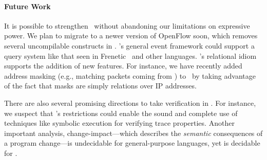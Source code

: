 

%
%
%
%


\paragraph{Future Work}

It is possible to strengthen \flowlog\ without abandoning our limitations on
expressive power. We plan to migrate to a newer version of OpenFlow soon,
which removes several uncompilable constructs in . 
\flowlog's general event framework could support a query system like that seen in
Frenetic~\cite{foster:icfp11-frenetic} and other languages.
\flowlog's relational idiom supports the addition of new features. For instance, we have 
recently added address masking (e.g., matching packets coming from ) to \flowlog\ by 
taking advantage of the fact that masks are simply relations over IP addresses. 

There are also several promising directions to take verification in \flowlog. 
For instance, we suspect that \flowlog's restrictions
could enable the sound and complete use of techniques like symbolic execution
for verifying trace properties.
Another important analysis, change-impact---which describes the
\emph{semantic} consequences of a program change---is undecidable for
general-purpose languages, yet is decidable for \flowlog.
